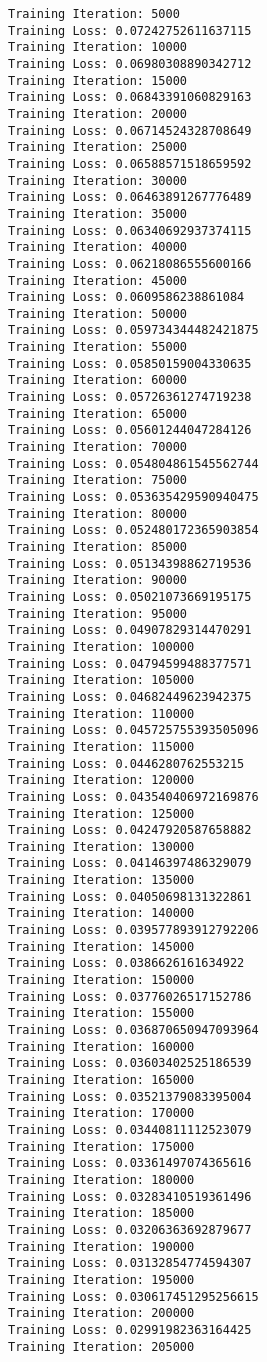 \documentclass[11pt]{article}
\begin{document}
    \begin{Verbatim}[commandchars=\\\{\}]
Training Iteration: 5000
Training Loss: 0.07242752611637115
Training Iteration: 10000
Training Loss: 0.06980308890342712
Training Iteration: 15000
Training Loss: 0.06843391060829163
Training Iteration: 20000
Training Loss: 0.06714524328708649
Training Iteration: 25000
Training Loss: 0.06588571518659592
Training Iteration: 30000
Training Loss: 0.06463891267776489
Training Iteration: 35000
Training Loss: 0.06340692937374115
Training Iteration: 40000
Training Loss: 0.06218086555600166
Training Iteration: 45000
Training Loss: 0.0609586238861084
Training Iteration: 50000
Training Loss: 0.059734344482421875
Training Iteration: 55000
Training Loss: 0.05850159004330635
Training Iteration: 60000
Training Loss: 0.05726361274719238
Training Iteration: 65000
Training Loss: 0.05601244047284126
Training Iteration: 70000
Training Loss: 0.054804861545562744
Training Iteration: 75000
Training Loss: 0.053635429590940475
Training Iteration: 80000
Training Loss: 0.052480172365903854
Training Iteration: 85000
Training Loss: 0.05134398862719536
Training Iteration: 90000
Training Loss: 0.05021073669195175
Training Iteration: 95000
Training Loss: 0.04907829314470291
Training Iteration: 100000
Training Loss: 0.04794599488377571
Training Iteration: 105000
Training Loss: 0.04682449623942375
Training Iteration: 110000
Training Loss: 0.045725755393505096
Training Iteration: 115000
Training Loss: 0.0446280762553215
Training Iteration: 120000
Training Loss: 0.043540406972169876
Training Iteration: 125000
Training Loss: 0.04247920587658882
Training Iteration: 130000
Training Loss: 0.04146397486329079
Training Iteration: 135000
Training Loss: 0.04050698131322861
Training Iteration: 140000
Training Loss: 0.039577893912792206
Training Iteration: 145000
Training Loss: 0.0386626161634922
Training Iteration: 150000
Training Loss: 0.03776026517152786
Training Iteration: 155000
Training Loss: 0.036870650947093964
Training Iteration: 160000
Training Loss: 0.03603402525186539
Training Iteration: 165000
Training Loss: 0.03521379083395004
Training Iteration: 170000
Training Loss: 0.03440811112523079
Training Iteration: 175000
Training Loss: 0.03361497074365616
Training Iteration: 180000
Training Loss: 0.03283410519361496
Training Iteration: 185000
Training Loss: 0.03206363692879677
Training Iteration: 190000
Training Loss: 0.03132854774594307
Training Iteration: 195000
Training Loss: 0.030617451295256615
Training Iteration: 200000
Training Loss: 0.02991982363164425
Training Iteration: 205000

\end{Verbatim}
\end{document}
